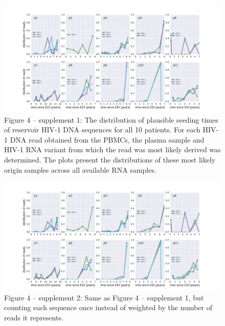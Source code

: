 \documentclass[aps,rmp,onecolumn,linenumbers]{revtex4-1}
\begin{document}
\begin{figure}
\centering
\includegraphics[width=\columnwidth]{figures/fig4_S1}
\caption{Figure 4 -- supplement 1: The distribution of plausible seeding times of reservoir HIV-1 DNA sequences for all 10 patients. For each HIV-1 DNA read obtained from the PBMCs, the plasma sample and HIV-1 RNA variant from which the read was most likely derived was determined. The plots present the distributions of these most likely origin samples across all available RNA samples.}
\label{fig:supp_timeline}
\end{figure}

\begin{figure}
\centering
\includegraphics[width=\columnwidth]{figures/fig4_S2}
\caption{Figure 4 -- supplement 2: Same as Figure 4 -- supplement 1, but counting each sequence once instead of weighted by the number of reads it represents.}
\label{fig:supp_timeline_hap}
\end{figure}

\clearpage
\end{document}
